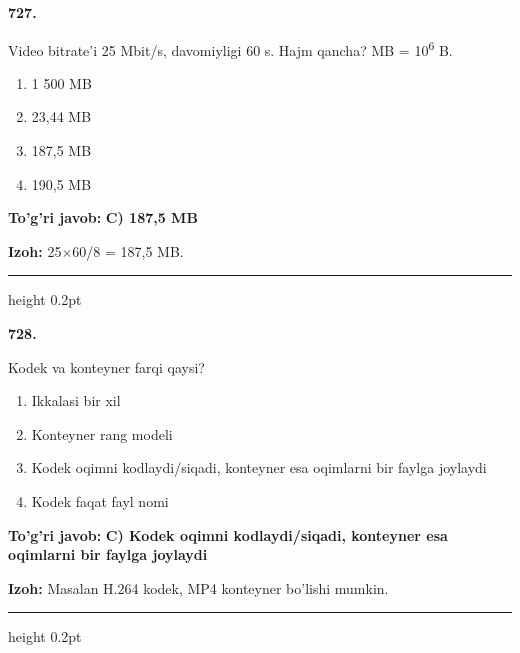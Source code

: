 \documentclass[10pt,a4paper,oneside]{article}
\begin{document}
\noindent\textbf{\color{ink}727.}
\par
Video bitrate'i 25 Mbit/s, davomiyligi 60 s. Hajm qancha? MB = 10\textsuperscript{6} B.
\begin{enumerate}[label=\Alph*),leftmargin=9mm]
\item 1 500 MB
\item 23,44 MB
\item 187,5 MB
\item 190,5 MB
\end{enumerate}
\begin{tcolorbox}[enhanced,breakable,colback=teal!4,colframe=teal!50!black,boxrule=0.5pt,arc=1.1mm,left=3mm,right=3mm,top=1.7mm,bottom=1.7mm,before skip=2mm,after skip=2mm]
\textbf{\color{teal}To'g'ri javob:} \textbf{C) 187,5 MB}
\par\smallskip
\textbf{Izoh:} 25\ensuremath{\times}60/8 = 187,5 MB.
\end{tcolorbox}
\vspace{2mm}\hrule height 0.2pt \vspace{3mm}

\noindent\textbf{\color{ink}728.}
\par
Kodek va konteyner farqi qaysi?
\begin{enumerate}[label=\Alph*),leftmargin=9mm]
\item Ikkalasi bir xil
\item Konteyner rang modeli
\item Kodek oqimni kodlaydi/siqadi, konteyner esa oqimlarni bir faylga joylaydi
\item Kodek faqat fayl nomi
\end{enumerate}
\begin{tcolorbox}[enhanced,breakable,colback=teal!4,colframe=teal!50!black,boxrule=0.5pt,arc=1.1mm,left=3mm,right=3mm,top=1.7mm,bottom=1.7mm,before skip=2mm,after skip=2mm]
\textbf{\color{teal}To'g'ri javob:} \textbf{C) Kodek oqimni kodlaydi/siqadi, konteyner esa oqimlarni bir faylga joylaydi}
\par\smallskip
\textbf{Izoh:} Masalan H.264 kodek, MP4 konteyner bo'lishi mumkin.
\end{tcolorbox}
\vspace{2mm}\hrule height 0.2pt \vspace{3mm}
\end{document}

